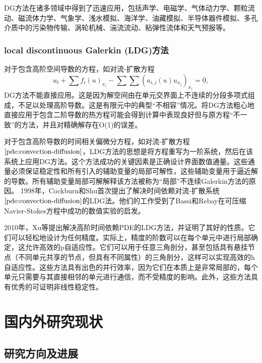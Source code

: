 DG方法在诸多领域中得到了迅速应用，包括声学、电磁学、气体动力学、颗粒流动、磁流体力学、气象学、浅水模拟、海洋学、油藏模拟、半导体器件模拟、多孔介质中的污染物传输、涡轮机械、湍流流动、粘弹性流体和天气预报等\cite{cockburn2000development}。

\subsubsection{local discontinuous Galerkin (LDG)方法}
对于包含高阶空间导数的方程，如对流-扩散方程
\begin{equation}
    u_t + \sum f_i(u)_{x_i} - \sum \sum (a_{i,j}(u)u_{x_j})_{x_i} = 0,\label{pde:convection-diffusion}
\end{equation}
DG方法不能直接应用。这是因为解空间由在单元交界面上不连续的分段多项式组成，不足以处理高阶导数。这是有限元中的典型“不相容”情况。将DG方法粗心地直接应用于包含二阶导数的热方程可能会得到计算中表现良好但与原方程“不一致”的方法，并且对精确解存在O(1)的误差\cite{cockburn2001runge,zhang2003analysis}。

对于包含高阶导数的时间相关偏微分方程，如对流-扩散方程$\ref{pde:convection-diffusion}$，LDG方法的思想是将方程重写为一阶系统，然后在该系统上应用DG方法。这个方法成功的关键因素是正确设计界面数值通量。这些通量必须保证稳定性和所有引入的辅助变量的局部可解性，这些辅助变量用于逼近解的导数。所有辅助变量局部可解解释该方法被称为“局部”不连续Galerkin方法的原因\cite{cockburn1998local}。
1998年，Cockburn和Shu首次提出了解决时间依赖对流-扩散系统$\ref{pde:convection-diffusion}$的LDG法\cite{cockburn1998local}。他们的工作受到了Bassi和Rebay在可压缩Navier-Stokes方程中成功的数值实验的启发\cite{bassi1997high}。

2010年，Xu等提出解决高阶时间依赖PDE的LDG方法\cite{xu2010local}，并证明了其好的性质。它们可以轻松地设计为任何精度。实际上，精度的阶数可以在每个单元中进行局部确定，这允许高效的p自适应性。它们可以用于任意三角剖分，甚至包括具有悬挂节点（不同单元共享的节点，但具有不同属性）的三角剖分，这样可以实现高效的h自适应性。这些方法具有出色的并行效率，因为它们在本质上是非常局部的，每个单元只需要与其直接相邻的单元进行通信，而不受精度的影响。此外，这些方法具有优秀的可证明非线性稳定性。

\section{国内外研究现状}

\subsection{研究方向及进展}

